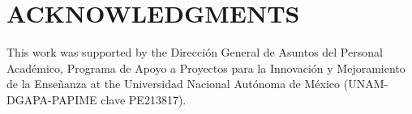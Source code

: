 \documentclass[12pt]{article}
\begin{document}
\section*{ACKNOWLEDGMENTS}
This work was
supported by the Dirección General de Asuntos del Personal Académico, Programa de Apoyo a Proyectos para la Innovación y Mejoramiento de la Enseñanza at the Universidad Nacional
Autónoma de México (UNAM-DGAPA-PAPIME clave PE213817).
 
\begin{small}

\end{small}
\end{document}
